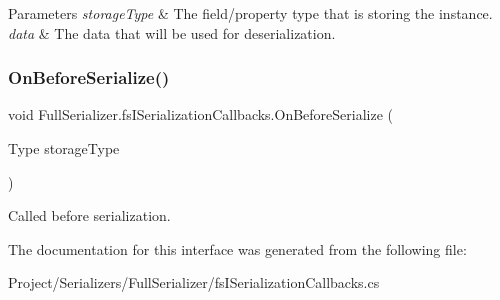\begin{DoxyParams}{Parameters}
{\em storage\+Type} & The field/property type that is storing the instance.\\
\hline
{\em data} & The data that will be used for deserialization.\\
\hline
\end{DoxyParams}
\mbox{\label{interface_full_serializer_1_1fs_i_serialization_callbacks_a65a034ba3c5a1326d606bd286e78f196}} 
\subsubsection{\texorpdfstring{On\+Before\+Serialize()}{OnBeforeSerialize()}}
{\footnotesize\ttfamily void Full\+Serializer.\+fs\+I\+Serialization\+Callbacks.\+On\+Before\+Serialize (\begin{DoxyParamCaption}\item[{Type}]{storage\+Type }\end{DoxyParamCaption})}



Called before serialization. 



The documentation for this interface was generated from the following file\+:\begin{DoxyCompactItemize}
\item 
Project/\+Serializers/\+Full\+Serializer/fs\+I\+Serialization\+Callbacks.\+cs\end{DoxyCompactItemize}
